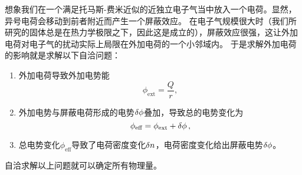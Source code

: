 想象我们在一个满足托马斯-费米近似的近独立电子气当中放入一个电荷。显然，异号电荷会移动到前者附近而产生一个屏蔽效应。
在电子气规模很大时（我们所研究的固体总是在热力学极限之下，因此这是成立的），屏蔽效应很强，这让外加电荷对电子气的扰动实际上局限在外加电荷的一个小邻域内。
于是求解外加电荷的影响就是求解以下自洽问题：
\begin{enumerate}
    \item 外加电荷导致外加电势能
    \begin{equation}
        \phi_\text{ext} = \frac{Q}{r},
    \end{equation}
    \item 外加电势与屏蔽电荷形成的电势$\var{\phi}$叠加，导致总的电势变化为
    \begin{equation}
        \phi_\text{eff} = \phi_\text{ext} + \var{\phi},
    \end{equation}
    \item 总电势变化$\phi_\text{eff}$导致了电荷密度变化$\var{n}$，电荷密度变化给出屏蔽电势$\var{\phi}$。
\end{enumerate}
自洽求解以上问题就可以确定所有物理量。

